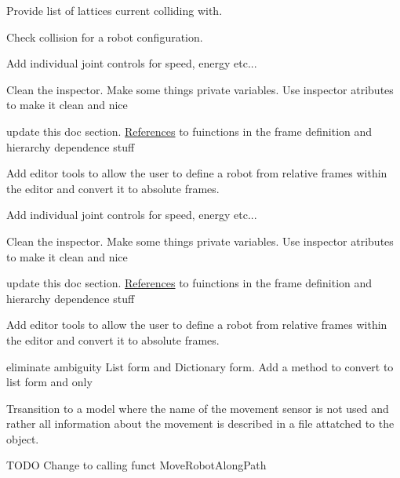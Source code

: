 \begin{DoxyRefList}
\label{todo__todo000011}%
%
Provide list of lattices current colliding with.

\label{todo__todo000012}%
%
Check collision for a robot configuration.  
\item[Class \mbox{\hyperlink{class_joint_class}{Joint\+Class}} ]\label{todo__todo000013}%
%
Add individual joint controls for speed, energy etc... 



Clean the inspector. Make some things private variables. Use inspector atributes to make it clean and nice

\label{todo__todo000014}%
%
update this doc section. \mbox{\hyperlink{class_references}{References}} to fuinctions in the frame definition and hierarchy dependence stuff

\label{todo__todo000015}%
%
Add editor tools to allow the user to define a robot from relative frames within the editor and convert it to absolute frames. 
\item[Class \mbox{\hyperlink{class_joint_class_illa3}{Joint\+Class\+Illa3}} ]\label{todo__todo000005}%
%
Add individual joint controls for speed, energy etc... 



Clean the inspector. Make some things private variables. Use inspector atributes to make it clean and nice

\label{todo__todo000006}%
%
update this doc section. \mbox{\hyperlink{class_references}{References}} to fuinctions in the frame definition and hierarchy dependence stuff

\label{todo__todo000007}%
%
Add editor tools to allow the user to define a robot from relative frames within the editor and convert it to absolute frames. 
\item[Class \mbox{\hyperlink{class_movement}{Movement}} ]\label{todo__todo000016}%
%
eliminate ambiguity List form and Dictionary form. Add a method to convert to list form and only  
\item[Member \mbox{\hyperlink{class_robot_script_aaaacc0eacd09c68f0e399dfb780c16a3}{Robot\+Script.Get\+Possible\+Movement\+Sensors}} ()]\label{todo__todo000017}%
%
Trsansition to a model where the name of the movement sensor is not used and rather all information about the movement is described in a file attatched to the object. ~\newline
  
\item[Member \mbox{\hyperlink{class_robot_script_a9213947f626c88acf4ce793020a9ef3d}{Robot\+Script.Move\+To\+Node}} (Game\+Object End\+Node)]\label{todo__todo000018}%
%
TODO Change to calling funct Move\+Robot\+Along\+Path 
\end{DoxyRefList}